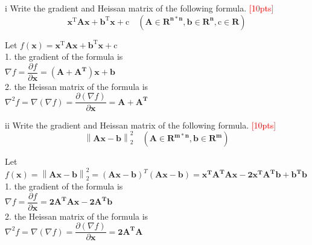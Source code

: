 \begin{center}\begin{LARGE} \end{LARGE}\end{center}

\newpage
\begin{problem}{i}
Write the gradient and Heissan matrix of the following formula.
\textcolor{red}{[10pts]}$$\mathbf{x}^{\mathrm{T}}\mathbf{Ax}+\mathbf{b}^{\mathrm{T}}\mathbf{x}+\mathrm{c}\quad(\mathbf{A}\in\mathbf{R^{n*n}}, \mathbf{b}\in\mathbf{R^{n}}, \mathrm{c}\in\mathbf{R})$$
\end{problem}

    Let $f(\mathbf{x})=\mathbf{x}^{\mathrm{T}}\mathbf{Ax}+\mathbf{b}^{\mathrm{T}}\mathbf{x}+\mathrm{c}$\\
   
    1. the gradient of the formula is\\
    $\nabla f=\dfrac{\partial f}{\partial\mathbf{x}}=\mathbf{(A+A^T)x}+\mathbf{b}$\\

    2. the Heissan matrix of the formula is\\
    $\nabla^2 f=\nabla(\nabla f)=\dfrac{\partial(\nabla f)}{\partial\mathbf{x}}=\mathbf{A+A^T}$\\
    




\newpage
\begin{problem}{ii}
Write the gradient and Heissan matrix of the following formula.
\textcolor{red}{[10pts]}$$\left\|\mathbf{Ax}-\mathbf{b}\right\|^{2}_{2}\quad(\mathbf{A}\in\mathbf{R^{m*n}}, \mathbf{b}\in\mathbf{R^{m}})$$
\end{problem}

    Let $f(\mathbf{x})=\left\|\mathbf{Ax}-\mathbf{b}\right\|^{2}_{2}=(\mathbf{Ax}-\mathbf{b})^T(\mathbf{Ax}-\mathbf{b})=\mathbf{x^TA^TAx}-\mathbf{2x^TA^Tb}+\mathbf{b^Tb}$\\
    1. the gradient of the formula is\\
    $\nabla f=\dfrac{\partial f}{\partial\mathbf{x}}=\mathbf{2A^TAx}-\mathbf{2A^Tb}$\\

    2. the Heissan matrix of the formula is\\
    $\nabla^2 f=\nabla(\nabla f)=\dfrac{\partial(\nabla f)}{\partial\mathbf{x}}=\mathbf{2A^TA}$\\

